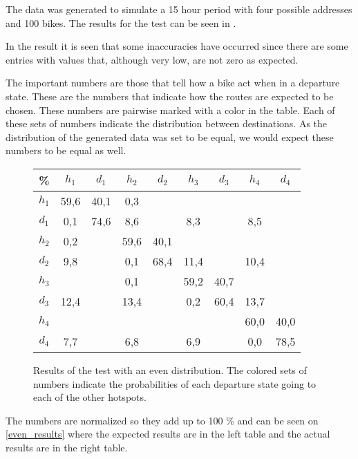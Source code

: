 The data was generated to simulate a 15 hour period with four possible addresses and 100 bikes.
The results for the test can be seen in .

In the result it is seen that some inaccuracies have occurred since there are some entries with values that, although very low, are not zero as expected.

The important numbers are those that tell how a bike act when in a departure state.
These are the numbers that indicate how the routes are expected to be chosen.
These numbers are pairwise marked with a color in the table.
Each of these sets of numbers indicate the distribution between destinations.
As the distribution of the generated data was set to be equal, we would expect these numbers to be equal as well.

\begin{figure}
	\centering
\begin{tabular}{|c | c c c c c c c c|}
\hline
\% &      $ h_1 $ & $ d_1 $ & $ h_2 $ & $ d_2 $ & $ h_3 $ & $ d_3 $ & $ h_4 $ & $ d_4 $\\
 \hline
$ h_1 $ & 59,6 &  40,1 & 0,3 &   &   &   &   &  \\
$ d_1 $ & 0,1 &  74,6 &  { \color{red} 8,6} &   &   {\color{red}8,3} &   &  {\color{red} 8,5} &  \\
$ h_2 $ & 0,2 &   &  59,6 &  40,1 &   &   &   &  \\
$ d_2 $ & {\color{blue}9,8} &   &   0,1 &  68,4 &  {\color{blue}11,4} &   &  {\color{blue}10,4} &  \\
$ h_3 $ & &   &   0,1 &   &  59,2 &  40,7 &   &  \\
$ d_3 $ & {\color{orange}12,4} &   &  {\color{orange}13,4} &   &   0,2 &  60,4 &  {\color{orange}13,7} &  \\
$ h_4 $ & &   &   &   &   &   &  60,0 &  40,0\\
$ d_4 $ & {\color{purple}7,7} &   &   {\color{purple}6,8} &   &   {\color{purple}6,9} &   &   0,0 &  78,5\\
\hline
\end{tabular}
\caption{Results of the test with an even distribution. The colored sets of numbers indicate the probabilities of each departure state going to each of the other hotspots.}\label{test_even}
\end{figure}

The numbers are normalized so they add up to 100 \% and can be seen on \cref{even_results} where the expected results are in the left table and the actual results are in the right table.

